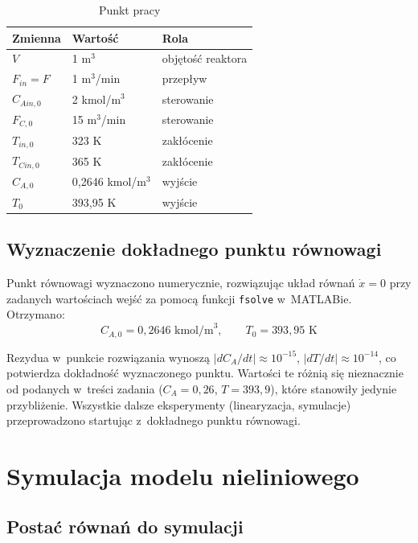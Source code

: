 \documentclass[a4paper,12pt]{article}
\begin{document}
\begin{table}[H]
\centering
\begin{tabular}{lll}
\toprule
\textbf{Zmienna} & \textbf{Wartość} & \textbf{Rola} \\
\midrule
$V$ & 1 m$^3$ & objętość reaktora \\
$F_{in} = F$ & 1 m$^3$/min & przepływ \\
$C_{Ain,0}$ & 2 kmol/m$^3$ & sterowanie \\
$F_{C,0}$ & 15 m$^3$/min & sterowanie \\
$T_{in,0}$ & 323 K & zakłócenie \\
$T_{Cin,0}$ & 365 K & zakłócenie \\
$C_{A,0}$ & 0{,}2646 kmol/m$^3$ & wyjście \\
$T_0$ & 393{,}95 K & wyjście \\
\bottomrule
\end{tabular}
\caption{Punkt pracy}
\end{table}

\subsection{Wyznaczenie dokładnego punktu równowagi}

Punkt równowagi wyznaczono numerycznie, rozwiązując układ równań $\dot{x} = 0$ przy zadanych wartościach wejść za pomocą funkcji \texttt{fsolve} w~MATLABie. Otrzymano:
\begin{equation}
    C_{A,0} = 0{,}2646 \text{ kmol/m}^3, \qquad T_0 = 393{,}95 \text{ K}
\end{equation}

Rezydua w~punkcie rozwiązania wynoszą $|dC_A/dt| \approx 10^{-15}$, $|dT/dt| \approx 10^{-14}$, co potwierdza dokładność wyznaczonego punktu. Wartości te różnią się nieznacznie od podanych w~treści zadania ($C_{A} = 0{,}26$, $T = 393{,}9$), które stanowiły jedynie przybliżenie. Wszystkie dalsze eksperymenty (linearyzacja, symulacje) przeprowadzono startując z~dokładnego punktu równowagi.

\section{Symulacja modelu nieliniowego}

\subsection{Postać równań do symulacji}
\end{document}
